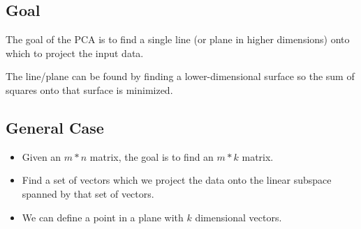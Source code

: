 \subsection{Goal}
The goal of the PCA is to find a single line (or plane in higher dimensions) onto which to project the input data.

The line/plane can be found by finding a lower-dimensional surface so the sum of squares onto that surface is minimized.

\subsection{General Case}
\begin{itemize}
    \item Given an $m * n$ matrix, the goal is to find an $m * k$ matrix.
    \item Find a set of vectors which we project the data onto the linear subspace spanned by that set of vectors.
    \item We can define a point in a plane with $k$ dimensional vectors.
\end{itemize}

